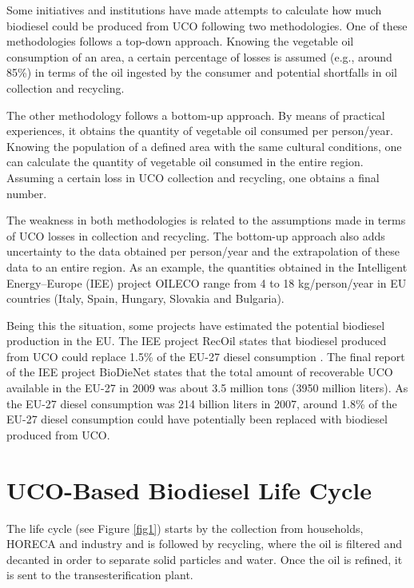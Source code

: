 \documentclass[sustainability,article,accept,moreauthors,pdftex,12pt,a4paper]{mdpi}
\begin{document}
Some initiatives and institutions have made attempts to calculate how much biodiesel could be produced from UCO following two methodologies. One of these methodologies follows a top-down approach. Knowing the vegetable oil consumption of an area, a certain percentage of losses is assumed (e.g., around 85\%) in terms of the oil ingested by the consumer and potential shortfalls in oil collection and recycling.

The other methodology follows a bottom-up approach. By means of practical experiences, it obtains the quantity of vegetable oil consumed per person/year. Knowing the population of a defined area with the same cultural conditions, one can calculate the quantity of vegetable oil consumed in the entire region. Assuming a certain loss in UCO collection and recycling, one obtains a final number.

The weakness in both methodologies is related to the assumptions made in terms of UCO losses in collection and recycling. The bottom-up approach also adds uncertainty to the data obtained per person/year and the extrapolation of these data to an entire region. As an example, the quantities obtained in the Intelligent Energy--Europe (IEE) project OILECO range from 4 to 18 kg/person/year \cite{OILECO2013} in EU countries (Italy, Spain, Hungary, Slovakia and Bulgaria).
 
Being this the situation, some projects have estimated the potential biodiesel production in the EU. The IEE project RecOil states that biodiesel produced from UCO could replace 1.5\% of the EU-27 diesel consumption \cite{RecOil2013}. The final report of the IEE project BioDieNet \cite{BioDieNet2009} states that the total amount of recoverable UCO available in the EU-27 in 2009 was about 3.5 million tons (3950 million liters). As the EU-27 diesel consumption was 214 billion liters in 2007, around 1.8\% of the EU-27 diesel consumption could have potentially been replaced with biodiesel produced from UCO.


\section{UCO-Based Biodiesel Life Cycle}

The life cycle (see Figure \ref{fig1}) starts by the collection from households, HORECA and industry and is followed by recycling, where the oil is filtered and decanted in order to separate solid particles and water. Once the oil is refined, it is sent to the transesterification plant.
\end{document}
